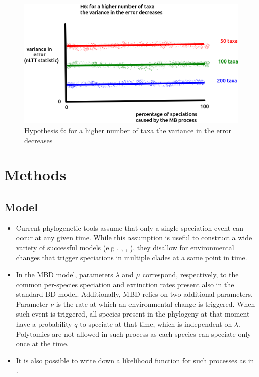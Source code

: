 \begin{itemize}
\begin{figure}[!htbp]
  \includegraphics[width=\textwidth]{fig_h_6.png}
  \caption{
    Hypothesis 6: for a higher number of taxa 
    the variance in the error decreases
  }
  \label{fig:h_6}
\end{figure}

\end{itemize}

\section{Methods}

\subsection{Model}
\begin{itemize}

\item 
{}
Current phylogenetic tools assume that only a single speciation event 
can occur at any given time.
While this assumption is useful to construct a wide variety of successful 
models (e.g \cite{Maddison2007biSSE}, \cite{Valente2015}, 
\cite{etienne2012diversity}, \cite{etienne2014estimating}),
they disallow for environmental changes that trigger speciations 
in multiple clades at a same point in time. 

\item 
{}
In the MBD model, parameters $\lambda$ and $\mu$ correspond, respectively, 
to the common per-species speciation and extinction rates present 
also in the standard BD model. 
Additionally, MBD relies on two additional parameters. 
Parameter $\nu$ is the rate at which an environmental change is triggered.
When such event is triggered, 
all species present in the phylogeny at that moment
have a probability $q$ to speciate at that time, which is 
independent on $\lambda$. 
Polytomies are not allowed in such process 
as each species can speciate only once at the time.

\item 
{}
It is also possible to write down a likelihood function 
for such processes as in \cite{mbd}.
    
\end{itemize}

